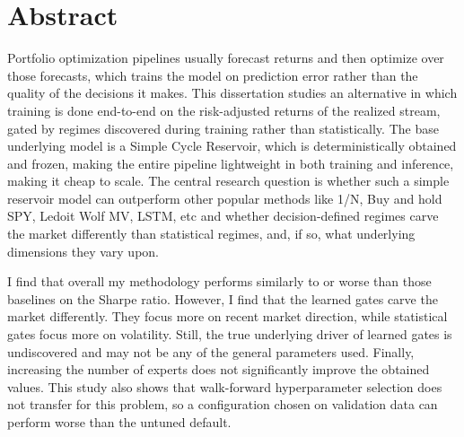 
\chapter*{Abstract}

Portfolio optimization pipelines usually forecast returns and then optimize over those forecasts, which trains the model on prediction error rather than the quality of the decisions it makes. This dissertation studies an alternative in which training is done end-to-end on the risk-adjusted returns of the realized stream, gated by regimes discovered during training rather than statistically. The base underlying model is a Simple Cycle Reservoir, which is deterministically obtained and frozen, making the entire pipeline lightweight in both training and inference, making it cheap to scale. The central research question is whether such a simple reservoir model can outperform other popular methods like 1/N, Buy and hold SPY, Ledoit Wolf MV, LSTM, etc and whether decision-defined regimes carve the market differently than statistical regimes, and, if so, what underlying dimensions they vary upon.

I find that overall my methodology performs similarly to or worse than those baselines on the Sharpe ratio. However, I find that the learned gates carve the market differently. They focus more on recent market direction, while statistical gates focus more on volatility. Still,  the true underlying driver of learned gates is undiscovered and may not be any of the general parameters used. Finally, increasing the number of experts does not significantly improve the obtained values. This study also shows that walk-forward hyperparameter selection does not transfer for this problem, so a configuration chosen on validation data can perform worse than the untuned default.
